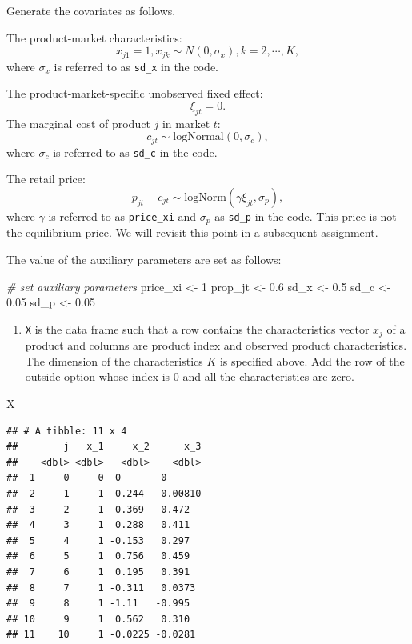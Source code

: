 \documentclass[]{book}
\newenvironment{Shaded}{\begin{snugshade}}{\end{snugshade}}
\newcommand{\DecValTok}[1]{\textcolor[rgb]{0.00,0.00,0.81}{#1}}
\newcommand{\FloatTok}[1]{\textcolor[rgb]{0.00,0.00,0.81}{#1}}
\newcommand{\StringTok}[1]{\textcolor[rgb]{0.31,0.60,0.02}{#1}}
\newcommand{\CommentTok}[1]{\textcolor[rgb]{0.56,0.35,0.01}{\textit{#1}}}
\newcommand{\NormalTok}[1]{#1}
\providecommand{\tightlist}{%
  \setlength{\itemsep}{0pt}\setlength{\parskip}{0pt}}
\begin{document}
Generate the covariates as follows.

The product-market characteristics: \[
x_{j1} = 1, x_{jk} \sim N(0, \sigma_x), k = 2, \cdots, K,
\] where \(\sigma_x\) is referred to as \texttt{sd\_x} in the code.

The product-market-specific unobserved fixed effect: \[
\xi_{jt} = 0.
\] The marginal cost of product \(j\) in market \(t\): \[
c_{jt} \sim \text{logNormal}(0, \sigma_c),
\] where \(\sigma_c\) is referred to as \texttt{sd\_c} in the code.

The retail price: \[
p_{jt} - c_{jt} \sim \text{logNorm}(\gamma \xi_{jt}, \sigma_p),
\] where \(\gamma\) is referred to as \texttt{price\_xi} and
\(\sigma_p\) as \texttt{sd\_p} in the code. This price is not the
equilibrium price. We will revisit this point in a subsequent
assignment.

The value of the auxiliary parameters are set as follows:

\begin{Shaded}
\begin{Highlighting}[]
\CommentTok{# set auxiliary parameters}
\NormalTok{price_xi <-}\StringTok{ }\DecValTok{1}
\NormalTok{prop_jt <-}\StringTok{ }\FloatTok{0.6}
\NormalTok{sd_x <-}\StringTok{ }\FloatTok{0.5}
\NormalTok{sd_c <-}\StringTok{ }\FloatTok{0.05}
\NormalTok{sd_p <-}\StringTok{ }\FloatTok{0.05}
\end{Highlighting}
\end{Shaded}

\begin{enumerate}
\def\labelenumi{\arabic{enumi}.}
\setcounter{enumi}{1}
\tightlist
\item
  \texttt{X} is the data frame such that a row contains the
  characteristics vector \(x_{j}\) of a product and columns are product
  index and observed product characteristics. The dimension of the
  characteristics \(K\) is specified above. Add the row of the outside
  option whose index is \(0\) and all the characteristics are zero.
\end{enumerate}

\begin{Shaded}
\begin{Highlighting}[]
\NormalTok{X}
\end{Highlighting}
\end{Shaded}

\begin{verbatim}
## # A tibble: 11 x 4
##        j   x_1     x_2      x_3
##    <dbl> <dbl>   <dbl>    <dbl>
##  1     0     0  0       0      
##  2     1     1  0.244  -0.00810
##  3     2     1  0.369   0.472  
##  4     3     1  0.288   0.411  
##  5     4     1 -0.153   0.297  
##  6     5     1  0.756   0.459  
##  7     6     1  0.195   0.391  
##  8     7     1 -0.311   0.0373 
##  9     8     1 -1.11   -0.995  
## 10     9     1  0.562   0.310  
## 11    10     1 -0.0225 -0.0281
\end{verbatim}
\end{document}
